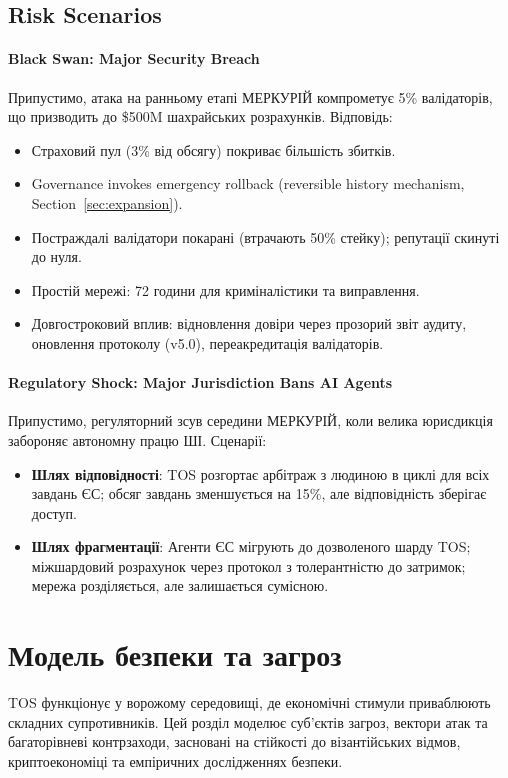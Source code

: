 \documentclass[11pt]{article}
\begin{document}
\subsection{Risk Scenarios}
\paragraph{Black Swan: Major Security Breach}
Припустимо, атака на ранньому етапі МЕРКУРІЙ компрометує 5\% валідаторів, що призводить до \$500M шахрайських розрахунків. Відповідь:
\begin{itemize}[noitemsep]
  \item Страховий пул (3\% від обсягу) покриває більшість збитків.
  \item Governance invokes emergency rollback (reversible history mechanism, Section~\ref{sec:expansion}).
  \item Постраждалі валідатори покарані (втрачають 50\% стейку); репутації скинуті до нуля.
  \item Простій мережі: 72 години для криміналістики та виправлення.
  \item Довгостроковий вплив: відновлення довіри через прозорий звіт аудиту, оновлення протоколу (v5.0), переакредитація валідаторів.
\end{itemize}

\paragraph{Regulatory Shock: Major Jurisdiction Bans AI Agents}
Припустимо, регуляторний зсув середини МЕРКУРІЙ, коли велика юрисдикція забороняє автономну працю ШІ. Сценарії:
\begin{itemize}[noitemsep]
  \item \textbf{Шлях відповідності}: TOS розгортає арбітраж з людиною в циклі для всіх завдань ЄС; обсяг завдань зменшується на 15\%, але відповідність зберігає доступ.
  \item \textbf{Шлях фрагментації}: Агенти ЄС мігрують до дозволеного шарду TOS; міжшардовий розрахунок через протокол з толерантністю до затримок; мережа розділяється, але залишається сумісною.
\end{itemize}

\section{Модель безпеки та загроз}
\label{sec:security}

TOS функціонує у ворожому середовищі, де економічні стимули приваблюють складних супротивників. Цей розділ моделює суб'єктів загроз, вектори атак та багаторівневі контрзаходи, засновані на стійкості до візантійських відмов, криптоекономіці та емпіричних дослідженнях безпеки.
\end{document}
